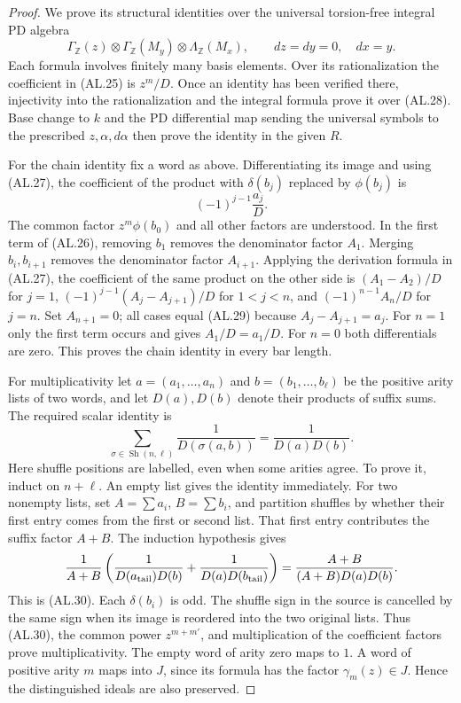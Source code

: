 \begin{proof}
We prove its structural identities over the universal
torsion-free integral PD algebra
\[
 \Gamma_{\mathbb Z}(z)\otimes
 \Gamma_{\mathbb Z}(M_y)\otimes
 \Lambda_{\mathbb Z}(M_x),\qquad dz=dy=0,\quad dx=y .
 \tag{AL.28}
\]
Each formula involves finitely many basis elements.
Over its rationalization the coefficient in
\textup{(AL.25)} is $z^m/D$.  Once an identity has been
verified there, injectivity into the rationalization and
the integral formula prove it over \textup{(AL.28)}.
Base change to $k$ and the PD differential map sending
the universal symbols to the prescribed $z,\alpha,d\alpha$
then prove the identity in the given $R$.

For the chain identity fix a word as above.  Differentiating
its image and using \textup{(AL.27)}, the coefficient of
the product with $\delta(b_j)$ replaced by $\phi(b_j)$ is
\[
          (-1)^{j-1}\frac{a_j}{D}.
 \tag{AL.29}
\]
The common factor $z^m\phi(b_0)$ and all other factors are
understood.  In the first term of \textup{(AL.26)}, removing
$b_1$ removes the denominator factor $A_1$.
Merging $b_i,b_{i+1}$ removes the denominator factor
$A_{i+1}$.  Applying the derivation formula in
\textup{(AL.27)}, the coefficient of the same product on
the other side is
$(A_1-A_2)/D$ for $j=1$,
$(-1)^{j-1}(A_j-A_{j+1})/D$ for $1<j<n$,
and $(-1)^{n-1}A_n/D$ for $j=n$.
Set $A_{n+1}=0$; all cases equal
\textup{(AL.29)} because $A_j-A_{j+1}=a_j$.
For $n=1$ only the first term occurs and gives
$A_1/D=a_1/D$.  For $n=0$ both differentials are zero.
This proves the chain identity in every bar length.

For multiplicativity let $a=(a_1,\ldots,a_n)$ and
$b=(b_1,\ldots,b_\ell)$ be the positive arity lists
of two words, and let $D(a),D(b)$ denote their products
of suffix sums.  The required scalar identity is
\[
 \sum_{\sigma\in\operatorname{Sh}(n,\ell)}
       \frac{1}{D(\sigma(a,b))}
            =\frac{1}{D(a)D(b)} .
 \tag{AL.30}
\]
Here shuffle positions are labelled, even when some
arities agree.  To prove it, induct on $n+\ell$.
An empty list gives the identity immediately.
For two nonempty lists, set $A=\sum a_i$, $B=\sum b_i$,
and partition shuffles by whether their first entry
comes from the first or second list.  That first entry
contributes the suffix factor $A+B$.  The induction
hypothesis gives
\[
 \frac{1}{A+B}
 \left(\frac{1}{D(a_{\rm tail})D(b)}
       +\frac{1}{D(a)D(b_{\rm tail})}\right)
 =\frac{A+B}{(A+B)D(a)D(b)} .
\]
This is \textup{(AL.30)}.  Each $\delta(b_i)$ is odd.
The shuffle sign in the source is cancelled by the
same sign when its image is reordered into the two
original lists.  Thus \textup{(AL.30)}, the common power
$z^{m+m'}$, and multiplication of the coefficient
factors prove multiplicativity.  The empty word of
arity zero maps to $1$.  A word of positive arity $m$
maps into $J$, since its formula has the factor
$\gamma_m(z)\in J$.  Hence the distinguished ideals
are also preserved.


\end{proof}

